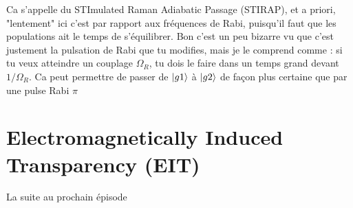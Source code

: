 \documentclass[a4paper]{report}
\begin{document}
Ca s'appelle du STImulated Raman Adiabatic Passage (STIRAP), et a priori, "lentement" ici c'est par rapport aux fréquences de Rabi, puisqu'il faut que les populations ait le temps de s'équilibrer. Bon c'est un peu bizarre vu que c'est justement la pulsation de Rabi que tu modifies, mais je le comprend comme : si tu veux atteindre un couplage $\Omega_R$, tu dois le faire dans un temps grand devant $1/\Omega_R$. Ca peut permettre de passer de $\ket{g1}$ à $\ket{g2}$ de façon plus certaine que par une pulse Rabi $\pi$

\section{Electromagnetically Induced Transparency (EIT)}

La suite au prochain épisode
 
  
\end{document}
